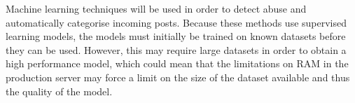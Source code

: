 Machine learning techniques will be used in order to detect abuse and automatically categorise incoming posts. Because these methods use supervised learning models, the models must initially be trained on known datasets before they can be used. However, this may require large datasets in order to obtain a high performance model, which could mean that the limitations on RAM in the production server may force a limit on the size of the dataset available and thus the quality of the model.
